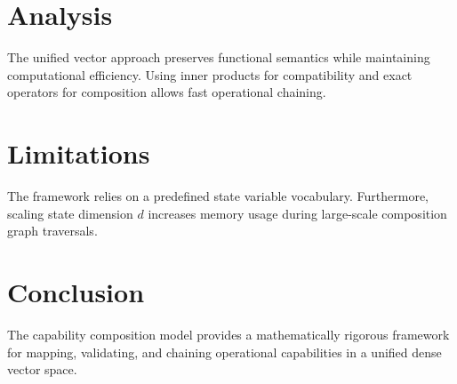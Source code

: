 \documentclass[11pt,a4paper]{article}
\begin{document}
\section{Analysis}
The unified vector approach preserves functional semantics while maintaining computational efficiency. Using inner products for compatibility and exact operators for composition allows fast operational chaining.

\section{Limitations}
The framework relies on a predefined state variable vocabulary. Furthermore, scaling state dimension $d$ increases memory usage during large-scale composition graph traversals.

\section{Conclusion}
The capability composition model provides a mathematically rigorous framework for mapping, validating, and chaining operational capabilities in a unified dense vector space.
\end{document}
